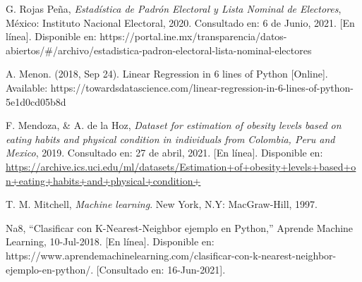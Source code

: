 \documentclass{article}
\begin{document}
\begin{thebibliography}{}
 G. Rojas Peña, \textit{Estadística de Padrón Electoral y Lista Nominal de Electores}, México: Instituto Nacional Electoral, 2020. Consultado en: 6 de Junio, 2021. [En línea]. Disponible en: https://portal.ine.mx/transparencia/datos-abiertos/\#/archivo/estadistica-padron-electoral-lista-nominal-electores

 A. Menon. (2018, Sep 24). Linear Regression in 6 lines of Python [Online]. Available: https://towardsdatascience.com/linear-regression-in-6-lines-of-python-5e1d0cd05b8d

 F. Mendoza, & A. de la Hoz, \textit{Dataset for estimation of obesity levels based on eating habits and physical condition in individuals from Colombia, Peru and Mexico}, 2019. Consultado en: 27 de abril, 2021. [En línea]. Disponible en: \url{https://archive.ics.uci.edu/ml/datasets/Estimation+of+obesity+levels+based+on+eating+habits+and+physical+condition+ }

 T. M. Mitchell, \textit{Machine learning}. New York, N.Y: MacGraw-Hill, 1997. 

 Na8, “Clasificar con K-Nearest-Neighbor ejemplo en Python,” Aprende Machine Learning, 10-Jul-2018. [En línea]. Disponible en: https://www.aprendemachinelearning.com/clasificar-con-k-nearest-neighbor-ejemplo-en-python/. [Consultado en: 16-Jun-2021]. 
\end{thebibliography}
\end{document}
